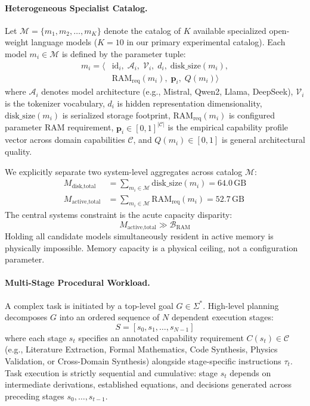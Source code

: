 \paragraph{Heterogeneous Specialist Catalog.}
Let $\mathcal{M} = \{m_1, m_2, \dots, m_K\}$ denote the catalog of $K$ available specialized open-weight language models ($K=10$ in our primary experimental catalog). Each model $m_i \in \mathcal{M}$ is defined by the parameter tuple:
\begin{equation}
\begin{aligned}
m_i = \big\langle &\text{id}_i, \;\mathcal{A}_i, \;\mathcal{V}_i, \;d_i, \;\text{disk\_size}(m_i), \\
&\text{RAM}_{\text{req}}(m_i), \;\mathbf{p}_i, \;Q(m_i) \big\rangle
\end{aligned}
\end{equation}
where $\mathcal{A}_i$ denotes model architecture (e.g., Mistral, Qwen2, Llama, DeepSeek), $\mathcal{V}_i$ is the tokenizer vocabulary, $d_i$ is hidden representation dimensionality, $\text{disk\_size}(m_i)$ is serialized storage footprint, $\text{RAM}_{\text{req}}(m_i)$ is configured parameter RAM requirement, $\mathbf{p}_i \in [0, 1]^{|\mathcal{C}|}$ is the empirical capability profile vector across domain capabilities $\mathcal{C}$, and $Q(m_i) \in [0, 1]$ is general architectural quality.

We explicitly separate two system-level aggregates across catalog $\mathcal{M}$:
\begin{align}
M_{\text{disk,total}} &= \sum_{m_i \in \mathcal{M}} \text{disk\_size}(m_i) = 64.0\,\text{GB} \\
M_{\text{active,total}} &= \sum_{m_i \in \mathcal{M}} \text{RAM}_{\text{req}}(m_i) = 52.7\,\text{GB}
\end{align}
The central systems constraint is the acute capacity disparity:
\begin{equation}
M_{\text{active,total}} \gg \mathcal{B}_{\text{RAM}}
\label{eq:capacity_inequality}
\end{equation}
Holding all candidate models simultaneously resident in active memory is physically impossible. Memory capacity is a physical ceiling, not a configuration parameter.

\paragraph{Multi-Stage Procedural Workload.}
A complex task is initiated by a top-level goal $G \in \Sigma^*$. High-level planning decomposes $G$ into an ordered sequence of $N$ dependent execution stages:
\begin{equation}
S = [s_0, s_1, \dots, s_{N-1}]
\end{equation}
where each stage $s_t$ specifies an annotated capability requirement $C(s_t) \in \mathcal{C}$ (e.g., Literature Extraction, Formal Mathematics, Code Synthesis, Physics Validation, or Cross-Domain Synthesis) alongside stage-specific instructions $\tau_t$. Task execution is strictly sequential and cumulative: stage $s_t$ depends on intermediate derivations, established equations, and decisions generated across preceding stages $s_0, \dots, s_{t-1}$.

